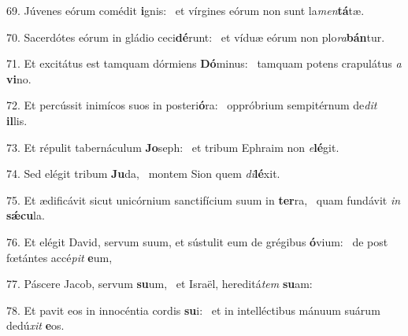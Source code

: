69. Júvenes eórum comédit \textbf{i}gnis: \ast\  et vírgines eórum non sunt la\textit{men}\textbf{tá}tæ.\

70. Sacerdótes eórum in gládio ceci\textbf{dé}runt: \ast\  et víduæ eórum non plo\textit{ra}\textbf{bán}tur.\

71. Et excitátus est tamquam dórmiens \textbf{Dó}minus: \ast\  tamquam potens crapulátus \textit{a} \textbf{vi}no.\

72. Et percússit inimícos suos in posteri\textbf{ó}ra: \ast\  oppróbrium sempitérnum de\textit{dit} \textbf{il}lis.\

73. Et répulit tabernáculum \textbf{Jo}seph: \ast\  et tribum Ephraim non \textit{e}\textbf{lé}git.\

74. Sed elégit tribum \textbf{Ju}da, \ast\  montem Sion quem \textit{di}\textbf{lé}xit.\

75. Et ædificávit sicut unicórnium sanctifícium suum in \textbf{ter}ra, \ast\  quam fundávit \textit{in} \textbf{sǽ}\textbf{cu}la.\

76. Et elégit David, servum suum, et sústulit eum de grégibus \textbf{ó}vium: \ast\  de post fœtántes accé\textit{pit} \textbf{e}um,\

77. Páscere Jacob, servum \textbf{su}um, \ast\  et Israël, hereditá\textit{tem} \textbf{su}am:\

78. Et pavit eos in innocéntia cordis \textbf{su}i: \ast\  et in intelléctibus mánuum suárum dedú\textit{xit} \textbf{e}os.\

